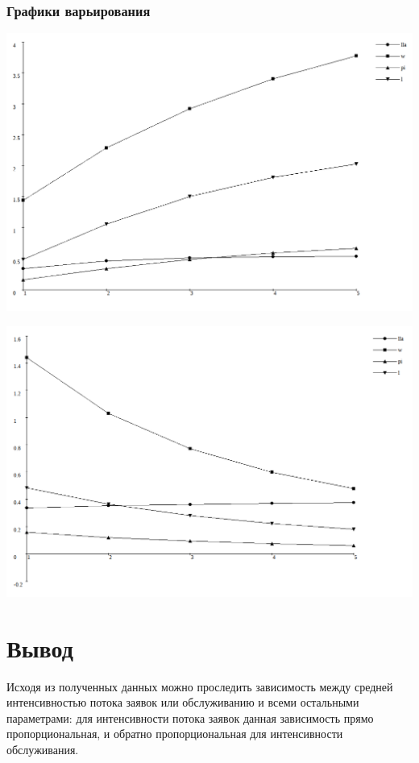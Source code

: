 \subsubsection{Графики варьирования}
\includegraphics[width=\textwidth,height=\textheight,keepaspectratio]{img/lagraph.png}

\includegraphics[width=\textwidth,height=\textheight,keepaspectratio]{img/mugraph.png}
\section{Вывод}
Исходя из полученных данных можно проследить зависимость между средней интенсивностью потока
заявок или обслуживанию и всеми остальными параметрами: для интенсивности потока заявок данная
зависимость прямо пропорциональная, и обратно пропорциональная для интенсивности обслуживания.

